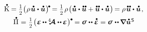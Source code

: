 \vspace{.3em}

\nopagebreak\begin{equation*}
\begin{array}{c}
\mathdotabove{\kinetic} = \smalldisplaystyleonehalf \bigl( \hspace{.1ex} \rho \hspace{.2ex} \mathdotabove{\bm{u}} \dotp \mathdotabove{\bm{u}} \hspace{.1ex} \bigr)^{\hspace{-0.2ex}\tikz[baseline=-0.2ex] \draw[black, fill=black] (0,0) circle (.28ex);} \hspace{-0.2ex}
= \smalldisplaystyleonehalf \hspace{.2ex} \rho \hspace{.2ex} \bigl( \mathdotabove{\bm{u}} \dotp \mathdotdotabove{\bm{u}} + \mathdotdotabove{\bm{u}} \dotp \mathdotabove{\bm{u}} \hspace{.1ex} \bigr)
\hspace{-0.22ex} =
\rho \hspace{.2ex} \mathdotdotabove{\bm{u}} \dotp \mathdotabove{\bm{u}}
\hspace{.2ex} ,
\\[.5em]
%
\mathdotabove{\potential} \hspace{.1ex} = \hspace{.1ex} \smash{\smalldisplaystyleonehalf} \hspace{-0.25ex} \tikzmark{beginDerivativeOfPotentialEnergyDensity} \left( \hspace{.1ex} \infinitesimaldeformation \hspace{-0.1ex} \dotdotp \hspace{-0.1ex} \stiffnesstensor \dotdotp \hspace{-0.1ex} \infinitesimaldeformation \hspace{.1ex} \right)^{\tikz[baseline=-0.2ex] \draw[black, fill=black] (0,0) circle (.28ex);} \hspace{-1.2ex} \tikzmark{endDerivativeOfPotentialEnergyDensity} \hspace{.7ex}
= \linearstress \dotdotp \mathdotabove{\infinitesimaldeformation}
= \linearstress \hspace{.1ex} \dotdotp \hspace{-0.12ex} \boldnabla \mathdotabove{\bm{u}}^{\hspace{.1ex}\mathsf{S}} \hspace{-0.12ex}

\end{array}
\end{equation*}
